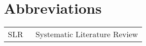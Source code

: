 \chapter*{Abbreviations}

\begin{flushleft}
\begin{tabular}{l p{0.8\linewidth}}
SLR      & Systematic Literature Review\\
\end{tabular}
\end{flushleft}

